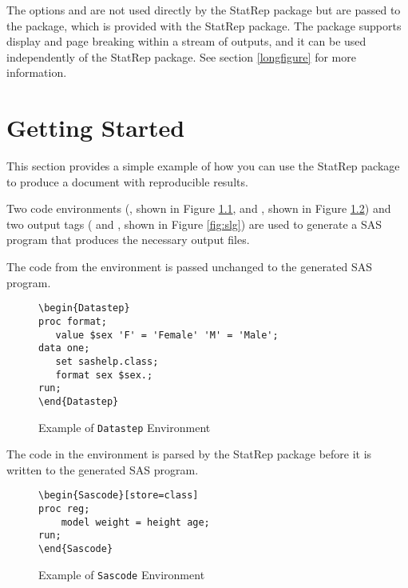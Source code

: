 \documentclass[article,oneside]{memoir}
\newcommand*{\StatRep}{\textsf{StatRep}\xspace}
\begin{document}
     The options  and  are not used directly by the \StatRep
     package but are passed to the  package, which
     is provided with the \StatRep package. 
    The  package
    supports display and page breaking within a stream of outputs, and it can be
    used independently of the \StatRep package. See section \ref{longfigure} for 
more information.
     
\chapter{Getting Started}\label{gs}

This section provides a simple example of how you can use the \StatRep package
to produce a document with reproducible results.

  Two code environments 
  (, shown in Figure \ref{fig:d1}, and 
  , shown in Figure \ref{fig:s1}) 
  and two output tags
  ( and , shown in Figure \ref{fig:slg}) 
  are used to generate a SAS program that produces 
  the necessary output files.
  
  The code from the  environment is passed unchanged to the 
  generated SAS program. 
\begin{figure}[H]
\begin{snugshade}
\begin{verbatim}
\begin{Datastep}
proc format;
   value $sex 'F' = 'Female' 'M' = 'Male';
data one;
   set sashelp.class;
   format sex $sex.;
run;
\end{Datastep}
\end{verbatim}
\end{snugshade}
\caption{Example of \texttt{Datastep} Environment}\label{fig:d1}
\end{figure}
  
  The code in the  environment is parsed by the \StatRep package before it is
  written to the generated SAS program. 

\begin{figure}[H]
\begin{snugshade}
\begin{verbatim}   
\begin{Sascode}[store=class]
proc reg;
    model weight = height age;
run;
\end{Sascode}
\end{verbatim}
\end{snugshade}
\caption{Example of \texttt{Sascode} Environment}\label{fig:s1}
\end{figure}
 
\end{document}
